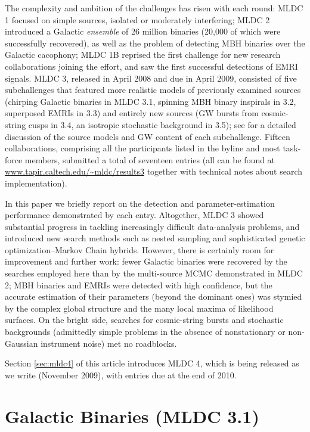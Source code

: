 \documentclass{iopart}
\begin{document}
The complexity and ambition of the challenges has risen with each round: MLDC 1 \cite{mldclisasymp,mldcgwdaw1} focused on simple sources, isolated or moderately interfering; MLDC 2 \cite{mldcgwdaw2,mldcamaldi2} introduced a Galactic \emph{ensemble} of 26 million binaries (20,000 of which were successfully recovered), as well as the problem of detecting MBH binaries over the Galactic cacophony; MLDC 1B \cite{MLDC3} reprised the first challenge for new research collaborations joining the effort, and saw the first successful detections of EMRI signals. MLDC 3, released in April 2008 and due in April 2009, consisted of five subchallenges that featured more realistic models of previously examined sources (chirping Galactic binaries in MLDC 3.1, spinning MBH binary inspirals in 3.2, superposed EMRIs in 3.3) and entirely new sources (GW bursts from cosmic-string cusps in 3.4, an isotropic stochastic background in 3.5); see \cite{MLDC3} for a detailed discussion of the source models and GW content of each subchallenge. Fifteen collaborations, comprising all the participants listed in the byline and most task-force members, submitted a total of seventeen entries (all can be found at \url{www.tapir.caltech.edu/~mldc/results3} together with technical notes about search implementation).

In this paper we briefly report on the detection and parameter-estimation performance demonstrated by each entry. Altogether, MLDC 3 showed substantial progress in tackling increasingly difficult data-analysis problems, and introduced new search methods such as nested sampling and sophisticated genetic optimization--Markov Chain hybrids. However, there is certainly room for improvement and further work: fewer Galactic binaries were recovered by the searches employed here than by the multi-source MCMC demonstrated in MLDC 2; MBH binaries and EMRIs were detected with high confidence, but the accurate estimation of their parameters (beyond the dominant ones) was stymied by the complex global structure and the many local maxima of likelihood surfaces. On the bright side, searches for cosmic-string bursts and stochastic backgrounds (admittedly simple problems in the absence of nonstationary or non-Gaussian instrument noise) met no roadblocks.

Section \ref{sec:mldc4} of this article introduces MLDC 4, which is being released as we write (November 2009), with entries due at the end of 2010.

\section{Galactic Binaries (MLDC 3.1)}
\end{document}

